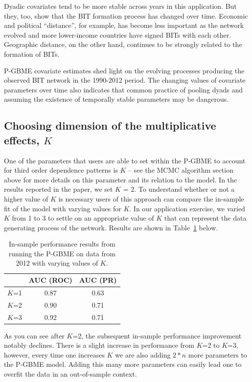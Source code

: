 \documentclass[a4paper, 12pt]{article}
\begin{document}
Dyadic covariates tend to be more stable across years in this application.  But they, too, show that the BIT formation process has changed over time.  Economic and political ``distance'', for example, has become less important as the network evolved and more lower-income countries have signed BITs with each other.  Geographic distance, on the other hand, continues to be strongly related to the formation of BITs.

P-GBME covariate estimates shed light on the evolving processes producing the observed BIT network in the 1990-2012 period.  The changing values of covariate parameters over time also indicates that common practice of pooling dyads and assuming the existence of temporally stable parameters may be dangerous.

\subsection{Choosing dimension of the multiplicative effects, $K$}

One of the parameters that users are able to set within the P-GBME to account for third order dependence patterns is $K$ -- see the MCMC algorithm section above for more details on this parameter and its relation to the model. In the results reported in the paper, we set $K$ = 2. To understand whether or not a higher value of $K$ is necessary users of this approach can compare the in-sample fit of the model with varying values for $K$. In our application exercise, we varied $K$ from 1 to 3 to settle on an appropriate value of $K$ that can represent the data generating process of the network. Results are shown in Table~\ref{tab:kvar} below.

\begin{table}[ht]
\centering
\caption{In-sample performance results from running the P-GBME on data from 2012 with varying values of $K$.}
\label{tab:kvar}
\begin{tabular}{lcc}
\toprule
~ & AUC (ROC) & AUC (PR) \\
\midrule
  $K$=1 & 0.87 & 0.63 \\
  $K$=2 & 0.90 & 0.71 \\
  $K$=3 & 0.92 & 0.71 \\ 
\bottomrule
\end{tabular}
\end{table}

As you can see after $K$=2, the subsequent in-sample performance improvement notably declines. There is a slight increase in performance from $K$=2 to $K$=3, however, every time one increases $K$ we are also adding $2*n$ more parameters to the P-GBME model. Adding this many more parameters can easily lead one to overfit the data in an out-of-sample context. 

\clearpage
\singlespacing


\end{document}
